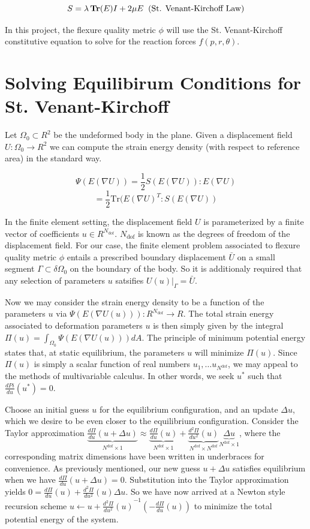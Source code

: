 \documentclass[11pt,letterpaper]{article}
\begin{document}
$$ S = \lambda \mathop{\bf Tr}(E) I + 2 \mu E \;\; \text{(St. Venant-Kirchoff Law)}$$

In this project, the flexure quality metric $\phi$ will use the St. Venant-Kirchoff constitutive equation to solve for the reaction forces $f(p,r,\theta)$.

\section{Solving Equilibirum Conditions for St. Venant-Kirchoff}
Let $\Omega_0 \subset R^2$ be the undeformed body in the plane. Given a displacement field $U : \Omega_0 \rightarrow R^2$ we can compute the strain energy density (with respect to reference area) in the standard way.

$$\Psi(E(\nabla U)) = \frac 1 2 S(E(\nabla U)):E(\nabla U) $$
$$= \frac 1 2 \text{Tr}(E(\nabla U)^T : S(E(\nabla U))$$


In the finite element setting, the displacement field $U$ is parameterized by a finite vector of coefficients $u \in R^{N_\text{dof}}$. $N_\text{dof}$ is known as the degrees of freedom of the displacement field. For our case, the finite element problem associated to flexure quality metric $\phi$ entails a prescribed boundary displacement $\bar U$ on a small segment $\Gamma \subset \delta\Omega_0$ on the boundary of the body. So it is additionaly required that any selection of parameters $u$ satsifies $U(u)|_\Gamma = \bar U$.

Now we may consider the strain energy density to be a function of the parameters $u$ via $\Psi(E(\nabla U(u))) : R^{N_\text{dof}} \rightarrow R$. The total strain energy associated to deformation parameters $u$ is then simply given by the integral $\Pi(u) = \int_{\Omega_0} \Psi(E(\nabla U(u))) dA$. The principle of minimum potential energy states that, at static equilibrium, the parameters $u$ will minimize $\Pi(u)$. Since $\Pi(u)$ is simply a scalar function of real numbers $u_1, \ldots u_{N^\text{dof}}$, we may appeal to the methods of multivariable calculus. In other words, we seek $u^*$ such that $\frac {d Pi} {du}(u^*) = 0$.

Choose an initial guess $u$ for the equilibrium configuration, and an update $\Delta u$, which we desire to be even closer to the equilibrium configuration. Consider the Taylor approximation $\underbrace{\frac {d\Pi}{du} (u + \Delta u)}_{N^\text{dof} \times 1} \approx \underbrace{\frac{d\Pi}{du} (u)}_{N^\text{dof} \times 1} + \underbrace{\frac{d^2\Pi}{du^2}(u)}_{N^\text{dof} \times N^\text{dof}}  \underbrace{\Delta u}_{N^\text{dof} \times 1} $, where the corresponding matrix dimensions have been written in underbraces for convenience. As previously mentioned, our new guess $u + \Delta u$ satisfies equilibrium when we have $\frac {d\Pi}{du} (u + \Delta u) = 0$. Substitution into the Taylor approximation yields  $0 = \frac{d\Pi}{du} (u) + \frac{d^2\Pi}{du^2}(u) \Delta u$. So we have now arrived at a Newton style recursion scheme $u \leftarrow u + {\frac{d^2\Pi}{du^2}(u)}^{-1} (-\frac{d\Pi}{du} (u))$  to minimize the total potential energy of the system.
\end{document}
